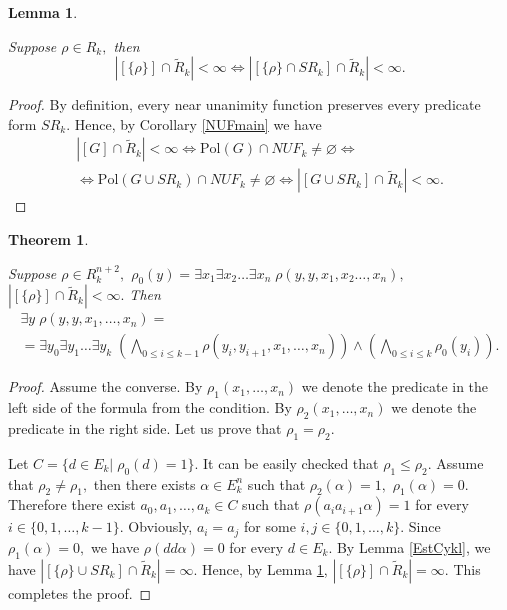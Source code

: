 \documentclass{au}
\theoremstyle{plain}
\newtheorem{theorem}{Theorem}
\newtheorem{lemma}{Lemma}
\theoremstyle{definition}
\theoremstyle{remark}
\numberwithin{equation}{section}
\begin{document}
\begin{lemma}\label{dobavleniePredikatovSR}

Suppose $\rho \in R_{k},$ then 
$$|[\{\rho\}]\cap \widetilde R_{k}| < \infty \Longleftrightarrow
|[\{\rho\}\cap SR_{k}]\cap \widetilde R_{k}| < \infty.$$

\end{lemma}

\begin{proof}

By definition, every near unanimity function preserves every predicate form $SR_{k}.$
Hence, by Corollary \ref{NUFmain} we have
\begin{multline*}|[G] \cap \widetilde R_{k}|<\infty \Longleftrightarrow
{
\mathrm{Pol}
}(G)\cap NUF_{k}\neq \varnothing \Longleftrightarrow  \\  \Longleftrightarrow
{
\mathrm{Pol}
}(G\cup SR_{k})\cap NUF_{k}\neq \varnothing \Longleftrightarrow
|[G\cup SR_{k}] \cap \widetilde R_{k}|<\infty.
\end{multline*}

\end{proof}

\begin{theorem}\label{GlavnoePreobrazovanie}

Suppose $\rho
\in R_{k}^{n+2},$
$\rho_{0}(y) = \exists x_{1}\exists x_{2}\ldots \exists x_{n}\; \rho(y,y,x_{1},x_{2}\ldots,x_{n}),$
$|[\{\rho\}]\cap \widetilde R_{k}| < \infty.$
Then
\begin{multline*}\exists y \; \rho(y,y,x_{1},\ldots,x_{n}) = \\ =
\exists y_{0} \exists y_{1}\ldots
\exists y_{k}\;
(\bigwedge\limits_{0\le i\le k-1}
\rho(y_{i},y_{i+1},x_{1},\ldots,x_{n}))
\wedge
(\bigwedge\limits_{0\le i\le k}
\rho_{0}(y_{i})).
\end{multline*}

\end{theorem}

\begin{proof}

Assume the converse.
By $\rho_{1}(x_{1},\ldots,x_{n})$ we denote the predicate in the left side of the formula from the condition.
By $\rho_{2}(x_{1},\ldots,x_{n})$ we denote the predicate in the right side.
Let us prove that $\rho_{1} = \rho_{2}.$

Let $C = \{ d\in E_{k}|\; \rho_{0}(d) = 1\}.$
It can be easily checked that
$\rho_{1}\le \rho_{2}.$
Assume that $\rho_{2}\neq \rho_{1},$
then there exists $\alpha\in E_{k}^{n}$
such that $\rho_{2}(\alpha) = 1,$
$\rho_{1}(\alpha) = 0.$
Therefore there exist $a_{0},a_{1},\ldots,a_{k}\in C$
such that $\rho(a_{i}a_{i+1}\alpha) = 1$ for every $i\in \{0,1,\ldots,k-1\}.$
Obviously, $a_{i} = a_{j}$ for some $i,j\in \{0,1,\ldots,k\}.$
Since $\rho_{1}(\alpha) = 0,$ we have
$\rho(d d \alpha) = 0$ for every $d\in E_{k}.$
By Lemma \ref{EstCykl}, we have
$|[\{\rho\} \cup SR_{k} ]\cap \widetilde R_{k}| = \infty.$
Hence, by Lemma \ref{dobavleniePredikatovSR},
$|[\{\rho\}]\cap \widetilde R_{k}| = \infty.$
This completes the proof.

\end{proof} 
\end{document}
